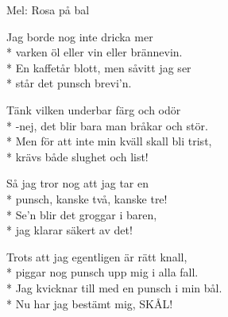 \begin{SongText}
    \begin{SongInfo}
        Mel: Rosa på bal
    \end{SongInfo}
    \begin{SongVerse}
        Jag borde nog inte dricka mer\\*%
        varken öl eller vin eller brännevin.\\*%
        En kaffetår blott, men såvitt jag ser\\*%
        står det punsch brevi’n.
    \end{SongVerse}
    \begin{SongVerse}
        Tänk vilken underbar färg och odör\\*%
        -nej, det blir bara man bråkar och stör.\\*%
        Men för att inte min kväll skall bli trist,\\*%
        krävs både slughet och list!
    \end{SongVerse}
    \begin{SongVerse}
        Så jag tror nog att jag tar en\\*%
        punsch, kanske två, kanske tre!\\*%
        Se’n blir det groggar i baren,\\*%
        jag klarar säkert av det!
    \end{SongVerse}
    \begin{SongVerse}
        Trots att jag egentligen är rätt knall,\\*%
        piggar nog punsch upp mig i alla fall.\\*%
        Jag kvicknar till med en punsch i min bål.\\*%
        Nu har jag bestämt mig, SKÅL!
    \end{SongVerse}
\end{SongText}